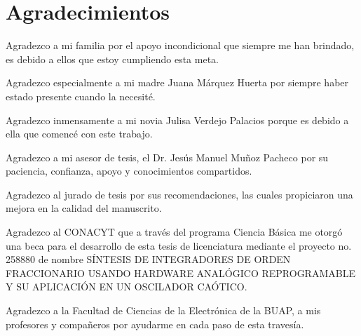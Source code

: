 \chapter{Agradecimientos}

Agradezco a mi familia por el apoyo incondicional que siempre me han brindado, es debido a ellos que estoy cumpliendo esta meta.

Agradezco especialmente a mi madre Juana Márquez Huerta por siempre haber estado presente cuando la necesité.

Agradezco inmensamente a mi novia Julisa Verdejo Palacios porque es debido a ella que comencé con este trabajo.

Agradezco a mi asesor de tesis, el Dr. Jesús Manuel Muñoz Pacheco por su paciencia, confianza, apoyo y conocimientos compartidos.

Agradezco al jurado de tesis por sus recomendaciones, las cuales propiciaron una mejora en la calidad del manuscrito.

Agradezco al CONACYT que a través del programa Ciencia Básica me otorgó una beca para el desarrollo de esta tesis de licenciatura mediante el proyecto no. 258880 de nombre SÍNTESIS DE INTEGRADORES DE ORDEN FRACCIONARIO USANDO HARDWARE ANALÓGICO REPROGRAMABLE Y SU APLICACIÓN EN UN OSCILADOR CAÓTICO.

Agradezco a la Facultad de Ciencias de la Electrónica de la BUAP, a mis profesores y compañeros por ayudarme en cada paso de esta travesía.


